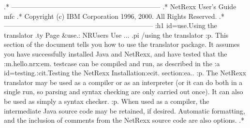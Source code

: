 .* ------------------------------------------------------------------
.* NetRexx User's Guide                                              mfc
.* Copyright (c) IBM Corporation 1996, 2000.  All Rights Reserved.
.* ------------------------------------------------------------------
:h1 id=use.Using the translator
.ty Page &use.: NRUsers Use ...
.pi /using the translator
:p.
This section of the document tells you how to use the
translator package.  It assumes you have successfully installed Java and
NetRexx, and have tested that the :m.hello.nrx:em. testcase can be
compiled and run, as described in the :a id=testing.:cit.Testing the
NetRexx Installation:ecit. section:ea..
:p.
The NetRexx translator may be used as a compiler or as an interpreter
(or it can do both in a single run, so parsing and syntax checking are
only carried out once).  It can also be used as simply a syntax checker.
:p.
When used as a compiler, the intermediate Java source code may be
retained, if desired.  Automatic formatting, and the inclusion of comments
from the NetRexx source code are also options.
.*
